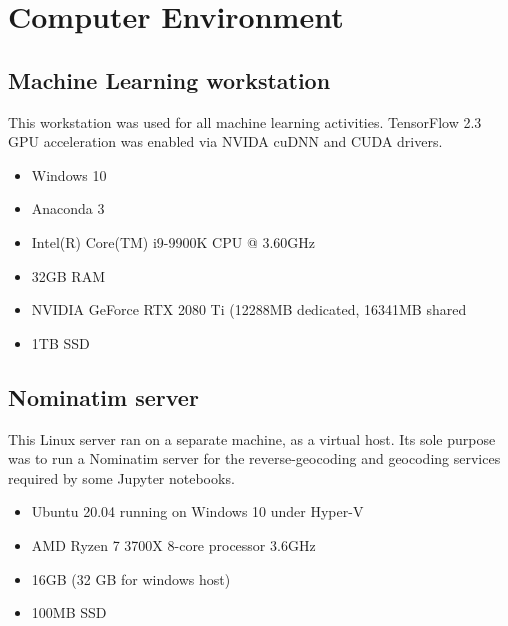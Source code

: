 \documentclass[11pt,twoside]{report}
\begin{document}
\chapter{Computer Environment}
\label{a:environment}

\section{Machine Learning workstation}
\label{a:computer}

This workstation was used for all machine learning activities.  TensorFlow 2.3 GPU acceleration was enabled via NVIDA cuDNN and CUDA drivers.

\begin{itemize}
\item{Windows 10}
\item{Anaconda 3}
\item{Intel(R) Core(TM) i9-9900K CPU @ 3.60GHz}	
\item{32GB RAM}
\item{NVIDIA GeForce RTX 2080 Ti (12288MB dedicated, 16341MB shared}
\item{1TB SSD}
\end{itemize}


\section{Nominatim server}
\label{a:nominatim}

This Linux server ran on a separate machine, as a virtual host.  Its sole purpose was to run a Nominatim server for the reverse-geocoding and geocoding services required by some Jupyter notebooks.

\begin{itemize}
\item{Ubuntu 20.04 running on Windows 10 under Hyper-V}
\item{AMD Ryzen 7 3700X 8-core processor 3.6GHz}
\item{16GB (32 GB for windows host)}
\item{100MB SSD}
\end{itemize}


\cleardoublepage


\end{document}
